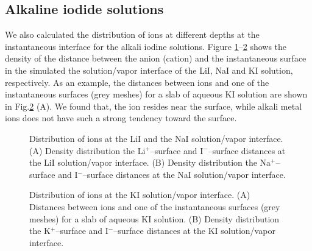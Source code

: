 \subsection{Alkaline iodide solutions}
We also calculated the distribution of ions at different depths at the instantaneous interface for the alkali iodine solutions.
Figure \ref{fig:prob_dist_Li_surf_I_surf}--\ref{fig:prob_dist_K_surf_I_surf} shows the density of the distance between the anion (cation) 
and the instantaneous surface in the simulated the solution/vapor interface of the LiI, NaI and KI solution, respectively. 
As an example, the distances between ions and one of the instantaneous surfaces (grey meshes) 
for a slab of aqueous KI solution are shown in Fig.\thinspace\ref{fig:prob_dist_K_surf_I_surf} (A). 
We found that, the \I ion resides near the surface, while alkali metal ions does not have such a strong tendency toward the surface. 
\begin{figure}[H]%
    \centering
    \qquad
    \caption{
Distribution of ions at the LiI and the NaI solution/vapor interface.   
(A) 
Density distribution the Li$^+$--surface and I$^-$--surface distances at the LiI solution/vapor interface. 
(B)
Density distribution the Na$^+$--surface and I$^-$--surface distances at the NaI solution/vapor interface. 
}%
    \label{fig:prob_dist_Li_surf_I_surf}%
\end{figure}
\begin{figure}[H]%
    \centering
    \qquad
    \caption{
Distribution of ions at the KI solution/vapor interface.   
(A) 
Distances between ions and one of the instantaneous surfaces (grey meshes) for a slab of aqueous KI solution. 
(B)
Density distribution the K$^+$--surface and I$^-$--surface distances at the KI solution/vapor interface. 
}%
    \label{fig:prob_dist_K_surf_I_surf}%
\end{figure}

